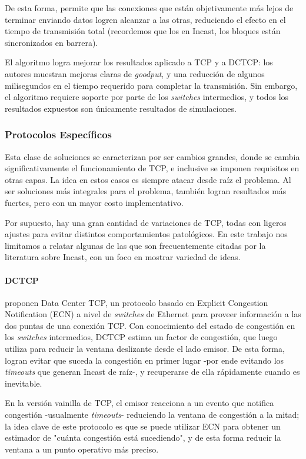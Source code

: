 \documentclass[runningheads,a4paper]{llncs}
\begin{document}
De esta forma, permite que las conexiones que están objetivamente más lejos de terminar enviando datos logren alcanzar a las otras, reduciendo el efecto en el tiempo de transmisión total (recordemos que los en Incast, los bloques están sincronizados en barrera).

El algoritmo logra mejorar los resultados aplicado a TCP y a DCTCP: los autores muestran mejoras claras de \textit{goodput}, y una reducción de algunos milisegundos en el tiempo requerido para completar la transmisión. Sin embargo, el algoritmo requiere soporte por parte de los \textit{switches} intermedios, y todos los resultados expuestos son únicamente resultados de simulaciones.

\subsubsection{Protocolos Específicos}

Esta clase de soluciones se caracterizan por ser cambios grandes, donde se cambia significativamente el funcionamiento de TCP, e inclusive se imponen requisitos en otras capas. La idea en estos casos es siempre atacar desde raíz el problema. Al ser soluciones más integrales para el problema, también logran resultados más fuertes, pero con un mayor costo implementativo.

Por supuesto, hay una gran cantidad de variaciones de TCP, todas con ligeros ajustes para evitar distintos comportamientos patológicos. En este trabajo nos limitamos a relatar algunas de las que son frecuentemente citadas por la literatura sobre Incast, con un foco en mostrar variedad de ideas. 

\paragraph{DCTCP}

\citet{Alizadeh_DCTCP_2010} proponen Data Center TCP, un protocolo basado en Explicit Congestion Notification (ECN) a nivel de \textit{switches} de Ethernet para proveer información a las dos puntas de una conexión TCP. Con conocimiento del estado de congestión en los \textit{switches} intermedios, DCTCP estima un factor de congestión, que luego utiliza para reducir la ventana deslizante desde el lado emisor. De esta forma, logran evitar que suceda la congestión en primer lugar -por ende evitando los \textit{timeouts} que generan Incast de raíz-, y recuperarse de ella rápidamente cuando es inevitable.

En la versión vainilla de TCP, el emisor reacciona a un evento que notifica congestión -usualmente \textit{timeouts}- reduciendo la ventana de congestión a la mitad; la idea clave de este protocolo es que se puede utilizar ECN para obtener un estimador de "cuánta congestión está sucediendo", y de esta forma reducir la ventana a un punto operativo más preciso.
\end{document}
